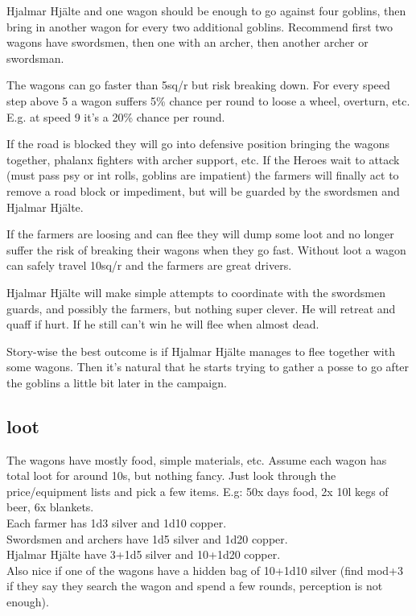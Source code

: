 Hjalmar Hjälte and one wagon should be enough to go against four goblins, then bring in another wagon for every two additional goblins. Recommend first two wagons have swordsmen, then one with an archer, then another archer or swordsman.

The wagons can go faster than 5sq/r but risk breaking down. For every speed step above 5 a wagon suffers 5\% chance per round to loose a wheel, overturn, etc. E.g. at speed 9 it's a 20\% chance per round.

If the road is blocked they will go into defensive position bringing the wagons together, phalanx fighters with archer support, etc. If the Heroes wait to attack (must pass psy or int rolls, goblins are impatient) the farmers will finally act to remove a road block or impediment, but will be guarded by the swordsmen and Hjalmar Hjälte.

If the farmers are loosing and can flee they will dump some loot and no longer suffer the risk of breaking their wagons when they go fast. Without loot a wagon can safely travel 10sq/r and the farmers are great drivers.

Hjalmar Hjälte will make simple attempts to coordinate with the swordsmen guards, and possibly the farmers, but nothing super clever. He will retreat and quaff if hurt. If he still can't win he will flee when almost dead.

Story-wise the best outcome is if Hjalmar Hjälte manages to flee together with some wagons. Then it's natural that he starts trying to gather a posse to go after the goblins a little bit later in the campaign.


\subsection*{loot}

The wagons have mostly food, simple materials, etc. Assume each wagon has total loot for around 10s, but nothing fancy. Just look through the price/equipment lists and pick a few items. E.g: 50x days food, 2x 10l kegs of beer, 6x blankets.\\
Each farmer has 1d3 silver and 1d10 copper.\\
Swordsmen and archers have 1d5 silver and 1d20 copper.\\
Hjalmar Hjälte have 3+1d5 silver and 10+1d20 copper.\\
Also nice if one of the wagons have a hidden bag of 10+1d10 silver (find mod+3 if they say they search the wagon and spend a few rounds, perception is not enough).

